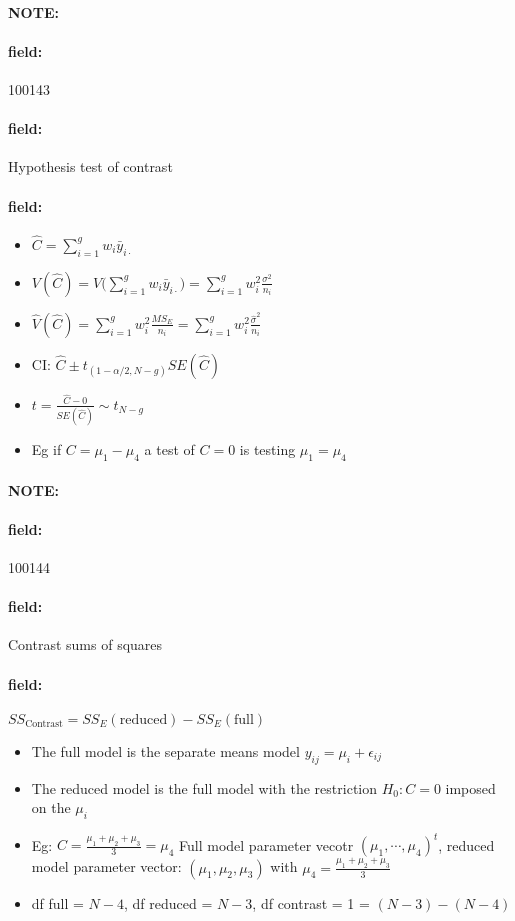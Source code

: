 \documentclass[12pt]{article}
\newenvironment{note}{\paragraph{NOTE:}}{}
\newenvironment{field}{\paragraph{field:}}{}
\begin{document}
\begin{note}
    \begin{field}
        \tiny 100143
    \end{field}
    \begin{field}
        Hypothesis test of contrast
    \end{field}
    \begin{field}
      \begin{itemize}
        \item $\hat{C} = \sum_{i=1}^g w_i \bar{y}_{i\cdot}$
        \item $V(\hat{C}) = V\bigg(\sum_{i=1}^g w_i\bar{y}_{i\cdot}\bigg) = \sum_{i=1}^g w_i^2 \frac{\sigma^2}{n_i}$
        \item $\hat{V}(\hat{C}) = \sum_{i=1}^g w_i^2 \frac{MS_E}{n_i} =  \sum_{i=1}^g w_i^2 \frac{\hat{\sigma}^2}{n_i} $
        \item CI: $\hat{C} \pm t_{(1 - \alpha/2, N-g)}SE(\hat{C})$
        \item $t = \frac{\hat{C} - 0}{SE(\hat{C})} \sim t_{N-g}$
        \item Eg if $C = \mu_1 - \mu_4$ a test of $C = 0$ is testing $\mu_1 = \mu_4$
      \end{itemize}
    \end{field}
\end{note}

\begin{note}
    \begin{field}
        \tiny 100144
    \end{field}
    \begin{field}
        Contrast sums of squares
    \end{field}
    \begin{field}
        $SS_{\text{Contrast}} = SS_E(\text{reduced}) - SS_E(\text{full})$

        \begin{itemize}
          \item The full model is the separate means model $y_{ij} = \mu_i + \epsilon_{ij}$
          \item The reduced model is the full model with the restriction $H_0: C = 0$ imposed on the $\mu_i$
          \item Eg: $C = \frac{\mu_1 + \mu_2 + \mu_3}{3} = \mu_4$
          Full model parameter vecotr $(\mu_1, \cdots, \mu_4)^t$, reduced model parameter vector: $(\mu_1, \mu_2, \mu_3)$ with $\mu_4 = \frac{\mu_1+ \mu_2 + \mu_3}{3}$
          \item df full = $N-4$, df reduced = $N-3$, df contrast = 1 = $(N-3) - (N-4)$
        \end{itemize}
    \end{field}
\end{note}
\end{document}
